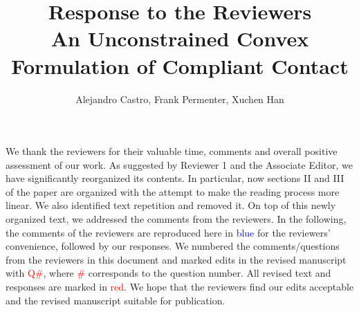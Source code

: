 \documentclass[12pt]{article}
\begin{document}
\author{Alejandro Castro, Frank Permenter, Xuchen Han}
\title{Response to the Reviewers \\
  \large An Unconstrained Convex Formulation of Compliant Contact}
\maketitle

We thank the reviewers for their valuable time, comments and overall positive
assessment of our work. As suggested by Reviewer 1 and the Associate Editor, we have
significantly reorganized its contents. In particular, now sections II
and III of the paper are organized with the attempt to make the reading process
more linear. We also identified text repetition and removed it. On top of this
newly organized text, we addressed the comments from the reviewers. In the
following, the comments of the reviewers are reproduced here in
\textcolor{blue}{blue} for the reviewers' convenience, followed by our
responses. We numbered the comments/questions from the reviewers in this
document and marked edits in the revised manuscript with \textcolor{red}{Q\#},
where \textcolor{red}{\#} corresponds to the question number. All revised text
and responses are marked in \textcolor{red}{red}. We hope that the reviewers
find our edits acceptable and the revised manuscript suitable for publication.





\end{document}
